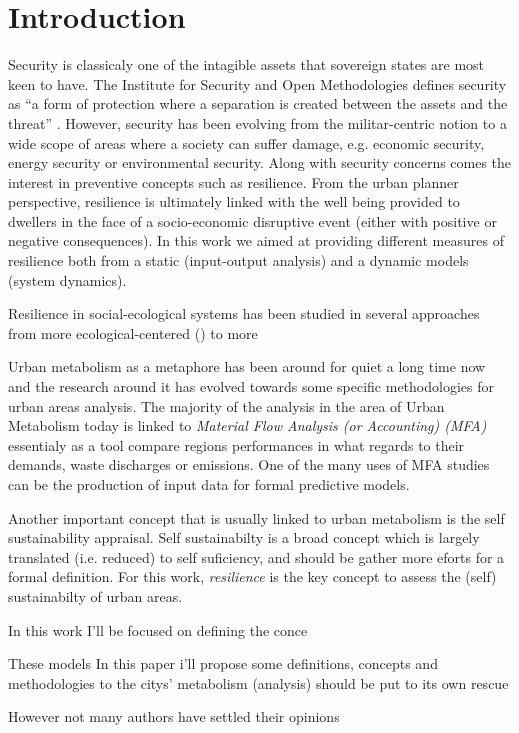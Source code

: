 \section{Introduction}

Security is classicaly one of the intagible assets that sovereign states are
most keen to have. The Institute for Security and Open Methodologies defines
security as ``a form of protection where a separation is created between the
assets and the threat'' \cite{ISECOM2010}. However, security has been evolving
from the militar-centric notion to a wide scope of areas where a society can
suffer damage, e.g. economic security, energy security or environmental
security. Along with security concerns comes the interest in preventive concepts
such as resilience. From the urban planner perspective, resilience is ultimately
linked with the well being provided to dwellers in the face of a socio-economic
disruptive event (either with positive or negative consequences). In this work
we aimed at providing different measures of resilience both from a static
(input-output analysis) and a dynamic models (system dynamics).

Resilience in social-ecological systems has been studied in several approaches
from more ecological-centered (\cite{Holling1973}) to more 



Urban metabolism as a metaphore has been around for quiet a long time now \citep{Wolman1965}   
and the research around it has evolved towards some specific methodologies for urban areas analysis.
The majority of the analysis in the area of Urban Metabolism today is 
linked to \emph{Material Flow Analysis (or Accounting) (MFA)}  
essentialy as a tool compare regions performances in what regards to their demands, waste discharges or emissions. 
One of the many uses of MFA studies can be the production of input data for formal predictive models.

Another important concept that is usually linked to urban metabolism is the self sustainability appraisal.
Self sustainabilty is a broad concept which is largely translated (i.e. reduced) to self suficiency, 
and should be gather more eforts for a formal definition. For this work, \emph{resilience} is the key concept
to assess the (self) sustainabilty of urban areas.  

In this work I'll be focused on defining the conce

These models 
In this paper i'll propose some definitions, concepts and methodologies to 
 the citys' metabolism (analysis) should be put to its own rescue 



However not many authors have settled their opinions  
